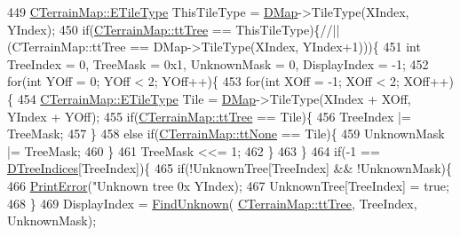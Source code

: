 \begin{DoxyCode}
449                 \hyperlink{classCTerrainMap_aff2ab991e237269941416dd79d8871d4}{CTerrainMap::ETileType} ThisTileType = \hyperlink{classCMapRenderer_ab9a199c61aa1c87a3248af3085d8ba52}{DMap}->TileType(XIndex, 
      YIndex);
450                 \textcolor{keywordflow}{if}(\hyperlink{classCTerrainMap_aff2ab991e237269941416dd79d8871d4a15600fc22dc08ff5a3aec20930112f8c}{CTerrainMap::ttTree} == ThisTileType)\{\textcolor{comment}{//||(CTerrainMap::ttTree ==
       DMap->TileType(XIndex, YIndex+1)))\{}
451                     \textcolor{keywordtype}{int} TreeIndex = 0, TreeMask = 0x1, UnknownMask = 0, DisplayIndex = -1;
452                     \textcolor{keywordflow}{for}(\textcolor{keywordtype}{int} YOff = 0; YOff < 2; YOff++)\{
453                         \textcolor{keywordflow}{for}(\textcolor{keywordtype}{int} XOff = -1; XOff < 2; XOff++)\{
454                             \hyperlink{classCTerrainMap_aff2ab991e237269941416dd79d8871d4}{CTerrainMap::ETileType} Tile = 
      \hyperlink{classCMapRenderer_ab9a199c61aa1c87a3248af3085d8ba52}{DMap}->TileType(XIndex + XOff, YIndex + YOff);
455                             \textcolor{keywordflow}{if}(\hyperlink{classCTerrainMap_aff2ab991e237269941416dd79d8871d4a15600fc22dc08ff5a3aec20930112f8c}{CTerrainMap::ttTree} == Tile)\{
456                                 TreeIndex |= TreeMask;   
457                             \}
458                             \textcolor{keywordflow}{else} \textcolor{keywordflow}{if}(\hyperlink{classCTerrainMap_aff2ab991e237269941416dd79d8871d4a481e779132fb16414d17870bd6229eb5}{CTerrainMap::ttNone} == Tile)\{
459                                 UnknownMask |= TreeMask;
460                             \}
461                             TreeMask <<= 1;
462                         \}
463                     \}
464                     \textcolor{keywordflow}{if}(-1 == \hyperlink{classCMapRenderer_a56708493a1499c671f4378204a0bfcb2}{DTreeIndices}[TreeIndex])\{
465                         \textcolor{keywordflow}{if}(!UnknownTree[TreeIndex] && !UnknownMask)\{
466                             \hyperlink{Debug_8h_a2ed825eefefe35baf59a93a8c641323d}{PrintError}(\textcolor{stringliteral}{"Unknown tree 0x%
      YIndex);   
467                             UnknownTree[TreeIndex] = \textcolor{keyword}{true};
468                         \}
469                         DisplayIndex = \hyperlink{classCMapRenderer_aec3c1d3294ac3af8ebb717ed5be88870}{FindUnknown}(
      \hyperlink{classCTerrainMap_aff2ab991e237269941416dd79d8871d4a15600fc22dc08ff5a3aec20930112f8c}{CTerrainMap::ttTree}, TreeIndex, UnknownMask);
}
\end{DoxyCode}
